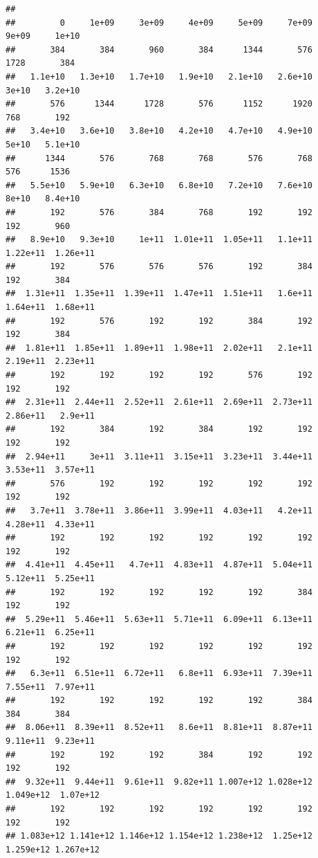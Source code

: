 \documentclass[
]{article}
\begin{document}
\begin{verbatim}
## 
##         0     1e+09     3e+09     4e+09     5e+09     7e+09     9e+09     1e+10 
##       384       384       960       384      1344       576      1728       384 
##   1.1e+10   1.3e+10   1.7e+10   1.9e+10   2.1e+10   2.6e+10     3e+10   3.2e+10 
##       576      1344      1728       576      1152      1920       768       192 
##   3.4e+10   3.6e+10   3.8e+10   4.2e+10   4.7e+10   4.9e+10     5e+10   5.1e+10 
##      1344       576       768       768       576       768       576      1536 
##   5.5e+10   5.9e+10   6.3e+10   6.8e+10   7.2e+10   7.6e+10     8e+10   8.4e+10 
##       192       576       384       768       192       192       192       960 
##   8.9e+10   9.3e+10     1e+11  1.01e+11  1.05e+11   1.1e+11  1.22e+11  1.26e+11 
##       192       576       576       576       192       384       192       384 
##  1.31e+11  1.35e+11  1.39e+11  1.47e+11  1.51e+11   1.6e+11  1.64e+11  1.68e+11 
##       192       576       192       192       384       192       192       384 
##  1.81e+11  1.85e+11  1.89e+11  1.98e+11  2.02e+11   2.1e+11  2.19e+11  2.23e+11 
##       192       192       192       192       576       192       192       192 
##  2.31e+11  2.44e+11  2.52e+11  2.61e+11  2.69e+11  2.73e+11  2.86e+11   2.9e+11 
##       192       384       192       384       192       192       192       192 
##  2.94e+11     3e+11  3.11e+11  3.15e+11  3.23e+11  3.44e+11  3.53e+11  3.57e+11 
##       576       192       192       192       192       192       192       192 
##   3.7e+11  3.78e+11  3.86e+11  3.99e+11  4.03e+11   4.2e+11  4.28e+11  4.33e+11 
##       192       192       192       192       192       192       192       192 
##  4.41e+11  4.45e+11   4.7e+11  4.83e+11  4.87e+11  5.04e+11  5.12e+11  5.25e+11 
##       192       192       192       192       192       384       192       192 
##  5.29e+11  5.46e+11  5.63e+11  5.71e+11  6.09e+11  6.13e+11  6.21e+11  6.25e+11 
##       192       192       192       192       192       192       192       192 
##   6.3e+11  6.51e+11  6.72e+11   6.8e+11  6.93e+11  7.39e+11  7.55e+11  7.97e+11 
##       192       192       192       192       192       384       384       384 
##  8.06e+11  8.39e+11  8.52e+11   8.6e+11  8.81e+11  8.87e+11  9.11e+11  9.23e+11 
##       192       192       192       384       192       192       192       192 
##  9.32e+11  9.44e+11  9.61e+11  9.82e+11 1.007e+12 1.028e+12 1.049e+12  1.07e+12 
##       192       192       192       192       192       192       192       192 
## 1.083e+12 1.141e+12 1.146e+12 1.154e+12 1.238e+12  1.25e+12 1.259e+12 1.267e+12 

\end{verbatim}
\end{document}
